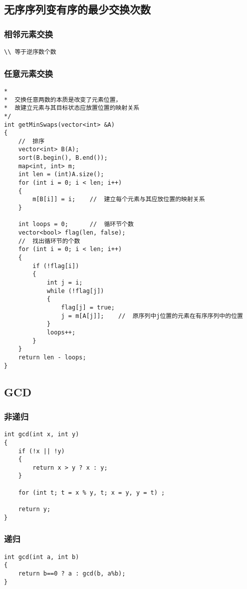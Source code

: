 \subsection{无序序列变有序的最少交换次数}
\subsubsection{相邻元素交换}
\begin{lstlisting}
\\ 等于逆序数个数
\end{lstlisting}

\subsubsection{任意元素交换}
\begin{lstlisting}
*
*  交换任意两数的本质是改变了元素位置，
*  故建立元素与其目标状态应放置位置的映射关系
*/
int getMinSwaps(vector<int> &A)
{
	//  排序
	vector<int> B(A);
	sort(B.begin(), B.end());
	map<int, int> m;
	int len = (int)A.size();
	for (int i = 0; i < len; i++)
	{
		m[B[i]] = i;    //  建立每个元素与其应放位置的映射关系
	}

	int loops = 0;      //  循环节个数
	vector<bool> flag(len, false);
	//  找出循环节的个数
	for (int i = 0; i < len; i++)
	{
		if (!flag[i])
		{
			int j = i;
			while (!flag[j])
			{
				flag[j] = true;
				j = m[A[j]];    //  原序列中j位置的元素在有序序列中的位置
			}
			loops++;
		}
	}
	return len - loops;
}
\end{lstlisting}

\subsection{GCD}
\subsubsection{非递归}
\begin{lstlisting}
int gcd(int x, int y)
{
	if (!x || !y)
	{
		return x > y ? x : y;
	}

	for (int t; t = x % y, t; x = y, y = t) ;

	return y;
}
\end{lstlisting}

\subsubsection{递归}
\begin{lstlisting}
int gcd(int a, int b)
{ 
	return b==0 ? a : gcd(b, a%b); 
}
\end{lstlisting}

